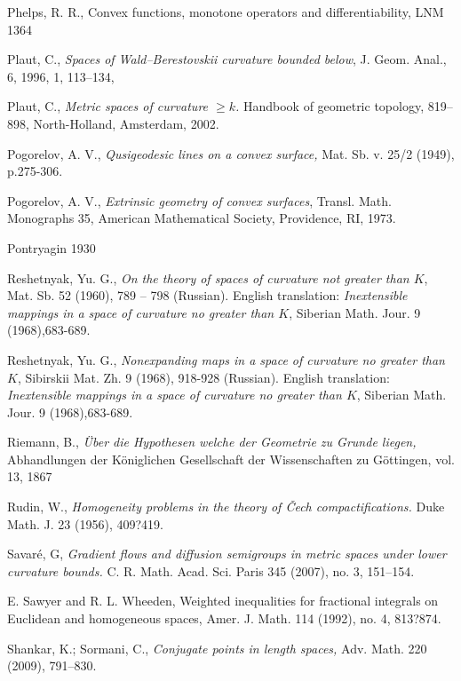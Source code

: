 \begin{thebibliography}{52}
Phelps, R. R., Convex functions, monotone operators and differentiability, LNM 1364

 {Plaut, C.},
      \textit{{Spaces of Wald--Berestovskii curvature bounded below}},
    {J. Geom. Anal.},
     {6},
     {1996},
     {1},
      {113--134},

Plaut, C., \textit{Metric spaces of curvature $\ge k$.} 
Handbook of geometric topology,  819--898, North-Holland, Amsterdam, 2002.

 Pogorelov, A. V., \textit{Qusigeodesic lines on a convex surface,} Mat. Sb. v. 25/2
(1949), p.275-306.

  Pogorelov, A. V., 
\textit{Extrinsic geometry of convex surfaces}, 
Transl. Math. Monographs 35, 
American Mathematical Society, Providence, RI, 1973.


 Pontryagin 1930

Reshetnyak, Yu. G.,
\textit{On the theory of spaces of curvature not greater than $K$},
 Mat. Sb. 52 (1960), 789 -- 798 (Russian).
English translation: \textit{Inextensible mappings in a space of curvature
no greater than $K$}, Siberian Math. Jour. 9 (1968),683-689.

Reshetnyak, Yu. G.,
\textit{Nonexpanding maps in a space of curvature no greater than $K$},
Sibirskii Mat. Zh. 9 (1968), 918-928 (Russian).
English translation: \textit{Inextensible mappings in a space of curvature
no greater than $K$}, Siberian Math. Jour. 9 (1968),683-689.


 Riemann, B., \textit{\"Uber die Hypothesen welche der Geometrie zu Grunde liegen,}
Abhandlungen der K\"oniglichen Gesellschaft der Wissenschaften zu G\"ottingen, vol. 13, 1867

Rudin, W.,
\textit{Homogeneity problems in the theory of \v{C}ech compactifications.}
Duke Math. J. 23 (1956), 409?419. 

Savar\'e, G, \textit{Gradient flows and diffusion semigroups in metric spaces under lower curvature bounds.}  C. R. Math. Acad. Sci. Paris  345  (2007),  no. 3, 151--154. 

 E. Sawyer and R. L. Wheeden, Weighted inequalities for fractional integrals on Euclidean and homogeneous spaces, Amer. J. Math. 114 (1992), no. 4, 813?874.

Shankar, K.; Sormani, C., \textit{Conjugate points in length spaces,} 
Adv. Math. 220 (2009), 791--830.


\end{thebibliography}
